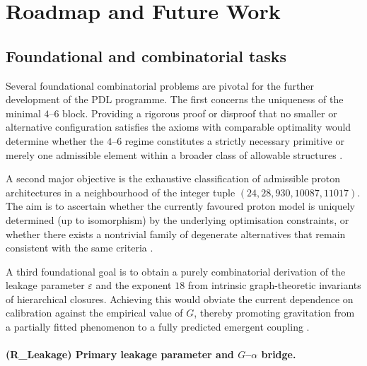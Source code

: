 \documentclass{article}
\begin{document}
\section{Roadmap and Future Work}
\label{sec:roadmap}

\subsection{Foundational and combinatorial tasks}
\label{subsec:roadmap_foundational}

Several foundational combinatorial problems are pivotal for the further development of the PDL programme. The first concerns the uniqueness of the minimal $4$–$6$ block. Providing a rigorous proof or disproof that no smaller or alternative configuration satisfies the axioms with comparable optimality would determine whether the $4$–$6$ regime constitutes a strictly necessary primitive or merely one admissible element within a broader class of allowable structures \citep{PDL_Main_2026,PDL_position}. 

A second major objective is the exhaustive classification of admissible proton architectures in a neighbourhood of the integer tuple $(24,28,930,10087,11017)$. The aim is to ascertain whether the currently favoured proton model is uniquely determined (up to isomorphism) by the underlying optimisation constraints, or whether there exists a nontrivial family of degenerate alternatives that remain consistent with the same criteria \citep{Combinatorial_Proton_v2_2026,PDL_position}. 

A third foundational goal is to obtain a purely combinatorial derivation of the leakage parameter $\varepsilon$ and the exponent $18$ from intrinsic graph-theoretic invariants of hierarchical closures. Achieving this would obviate the current dependence on calibration against the empirical value of $G$, thereby promoting gravitation from a partially fitted phenomenon to a fully predicted emergent coupling \citep{Exponent_18_PDL_2026,Coherence_Leakage_18_2026,PDL_position}.
\paragraph{(R\_Leakage) Primary leakage parameter and $G$--$\alpha$ bridge.}
\end{document}
